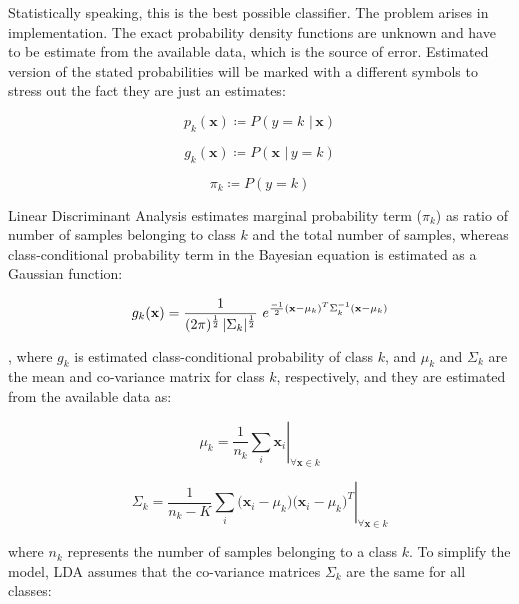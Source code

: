 \documentclass{article}
\begin{document}
Statistically speaking, this is the best possible classifier. The problem arises in implementation. The exact probability density functions are unknown and have to be estimate from the available data, which is the source of error.
Estimated version of the stated probabilities will be marked with a different symbols to stress out the fact they are just an estimates:

\begin{equation} 
p_k(\mathbf{x}) \coloneqq P(y=k \,\, | \, \mathbf{x})
\end{equation}

\begin{equation} 
g_k(\mathbf{x}) \coloneqq P(\mathbf{x}  \,\, | \, y=k)
\end{equation}

\begin{equation} 
\pi_k \coloneqq P(y=k)
\end{equation}


Linear Discriminant Analysis estimates marginal probability term ($\pi_k$) as ratio of number of samples belonging to class $k$ and the total  number of samples, whereas class-conditional probability term in the Bayesian equation is estimated as a Gaussian function:

\begin{equation} 
g_k(\mathbf{x}) = \frac{1}{(2 \pi)^{\nicefrac{1}{2}}\, |\Sigma_k|^{\nicefrac{1}{2}}}\,\, e^{\nicefrac{-1}{2}  (\mathbf{x}-\mu_k)^T  \Sigma_k^{-1} (\mathbf{x}-\mu_k)} 
\end{equation}

, where $g_k$ is estimated class-conditional probability of class $k$, and $\mu_k$ and $\Sigma_k$ are the mean and co-variance matrix for class $k$, respectively, and they are estimated from the available data as:

\begin{equation}
\left. \mu_k = \frac{1}{n_k} \sum_{i}{\mathbf{x}_i} \right\vert_{\forall \mathbf{x} \in k}
\end{equation}

\begin{equation}
\left. \Sigma_k = \frac{1}{n_k-K} \sum_{i}{\Big( \mathbf{x}_i - \mu_k \Big) \Big( \mathbf{x}_i - \mu_k \Big)^T} \right\vert_{\forall \mathbf{x} \in k}
\end{equation}

 
where $n_k$ represents the number of samples belonging to a class $k$.
To simplify the model, LDA assumes that the co-variance matrices $\Sigma_k$ are the same for all classes:
\end{document}
